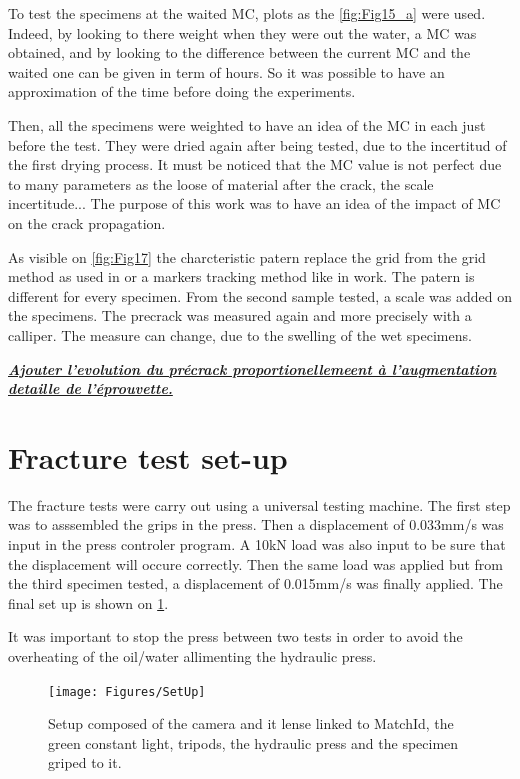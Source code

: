 To test the specimens at the waited MC, plots as the \ref{fig:Fig15_a} were used. Indeed, by looking to there weight when they were out the water, a MC was obtained, and by looking to the difference between the current MC and the waited one can be given in term of hours. So it was possible to have an approximation of the time before doing the experiments.

Then, all the specimens were weighted to have an idea of the MC in each just before the test. They were dried again after being tested, due to the incertitud of the first drying process. It must be noticed that the MC value is not perfect due to many parameters as the loose of material after the crack, the scale incertitude...
The purpose of this work was to have an idea of the impact of MC on the crack propagation.

As visible on \ref{fig:Fig17} the charcteristic patern replace the grid from the grid method as used in \parencite{Reference7} or a markers tracking method like in \parencite{Reference18} work. The patern is different for every specimen. From the second sample tested, a scale was added on the specimens.
The precrack was measured again and more precisely with a calliper. The measure can change, due to the swelling of the wet specimens.

\textbf{\textit{\underline{Ajouter l'evolution du précrack proportionellemeent à l'augmentation detaille de l'éprouvette.
}}}
\section{Fracture test set-up}

The fracture tests were carry out using a universal testing machine. The first step was to asssembled the grips in the press. Then a displacement of 0.033mm/s was input in the press controler program. A 10kN load was also input to be sure that the displacement will occure correctly. Then the same load was applied but from the third specimen tested, a displacement of 0.015mm/s was finally applied. The final set up is shown on \ref{fig:Fig18}.

It was important to stop the press between two tests in order to avoid the overheating of the oil/water allimenting the hydraulic press.

\begin{figure}[t]
	\centering
	\texttt{[image: Figures/SetUp]}
	\decoRule
	\caption[Final setup]{Setup composed of the camera and it lense linked to MatchId, the green constant light, tripods, the hydraulic press and the specimen griped to it.}
	\label{fig:Fig18}
\end{figure}

